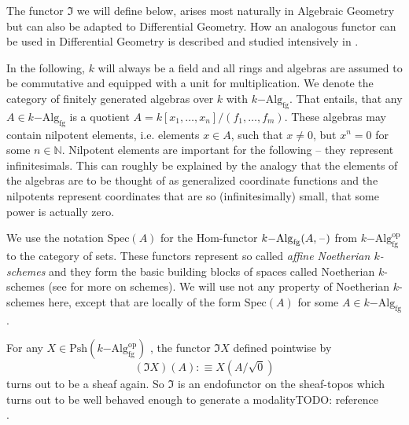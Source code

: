 \documentclass[9pt,twosided]{amsart}
\newcommand{\bN}{\mathbb N}
\newcommand{\Spec}{\ensuremath{\mathrm{Spec}}}
\newcommand{\fgkAlg}{\ensuremath{k\mathrm{-Alg}_{\mathrm{fg}}}}
\newcommand{\todo}[1]{{\color{red}TODO: #1 \\}}
\begin{document}
The functor $\Im$ we will define below, arises most naturally in Algebraic Geometry but can also be adapted to Differential Geometry.
How an analogous functor can be used in Differential Geometry is described and studied intensively in \cite{SyntheticPDEs}.

In the following, $k$ will always be a field and all rings and algebras are assumed to be commutative and equipped with a unit for multiplication.
We denote the category of finitely generated algebras over $k$ with $k\mathrm{-Alg}_{\mathrm{fg}}$.
That entails, that any $A\in k\mathrm{-Alg}_{\mathrm{fg}}$ is a quotient $A=k[x_1,\dots,x_n]/(f_1,\dots,f_m)$.
These algebras may contain nilpotent elements, i.e. elements $x\in A$, such that $x\neq 0$, but $x^n=0$ for some $n\in\bN$.
Nilpotent elements are important for the following -- they represent infinitesimals.
This can roughly be explained by the analogy
that the elements of the algebras are to be thought of as generalized coordinate functions
and the nilpotents represent coordinates that are so (infinitesimally) small, that some power is actually zero. 

We use the notation $\Spec(A)$ for the Hom-functor $k\mathrm{-Alg}_{\mathrm{fg}}(A,\mathord{\hspace{1pt}\text{--}\hspace{1pt}})$ from $k\mathrm{-Alg}^{\mathrm{op}}_{\mathrm{fg}}$ to the category of sets.
These functors represent so called \emph{affine Noetherian $k$-schemes} and they form the basic building blocks of spaces called Noetherian $k$-schemes
(see \cite[Chapter II]{hartshorne} for more on schemes).
We will use not any property of Noetherian $k$-schemes here, except that are locally of the form $\Spec(A)$ for some $A\in\fgkAlg$.

For any $X\in\mathrm{Psh}(k\mathrm{-Alg}^\mathrm{op}_{\mathrm{fg}})$ ,
the functor $\Im X$ defined pointwise by
\[ (\Im X)(A):\equiv X(A/\sqrt{0})\]
turns out to be a sheaf again. So $\Im$ is an endofunctor on the sheaf-topos which turns out to be well behaved enough to generate a modality\todo{reference}.
\end{document}
